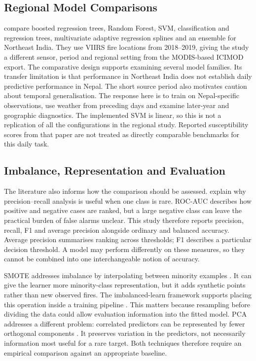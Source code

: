 \documentclass[conference,a4paper]{IEEEtran}
\begin{document}
\subsection{Regional Model Comparisons}
\citet{sarkar} compare boosted regression trees, Random Forest, SVM, classification and regression trees, multivariate adaptive regression splines and an ensemble for Northeast India. They use VIIRS fire locations from 2018--2019, giving the study a different sensor, period and regional setting from the MODIS-based ICIMOD export. The comparative design supports examining several model families. Its transfer limitation is that performance in Northeast India does not establish daily predictive performance in Nepal. The short source period also motivates caution about temporal generalisation. The response here is to train on Nepal-specific observations, use weather from preceding days and examine later-year and geographic diagnostics. The implemented SVM is linear, so this is not a replication of all the configurations in the regional study. Reported susceptibility scores from that paper are not treated as directly comparable benchmarks for this daily task.

\subsection{Imbalance, Representation and Evaluation}
The literature also informs how the comparison should be assessed. \citet{saito} explain why precision--recall analysis is useful when one class is rare. ROC-AUC describes how positive and negative cases are ranked, but a large negative class can leave the practical burden of false alarms unclear. This study therefore reports precision, recall, F1 and average precision alongside ordinary and balanced accuracy. Average precision summarises ranking across thresholds; F1 describes a particular decision threshold. A model may perform differently on these measures, so they cannot be combined into one interchangeable notion of accuracy.

SMOTE addresses imbalance by interpolating between minority examples \citep{chawla}. It can give the learner more minority-class representation, but it adds synthetic points rather than new observed fires. The imbalanced-learn framework supports placing this operation inside a training pipeline \citep{lemaitre}. This matters because resampling before dividing the data could allow evaluation information into the fitted model. PCA addresses a different problem: correlated predictors can be represented by fewer orthogonal components \citep{jolliffe}. It preserves variation in the predictors, not necessarily information most useful for a rare target. Both techniques therefore require an empirical comparison against an appropriate baseline.
\end{document}
